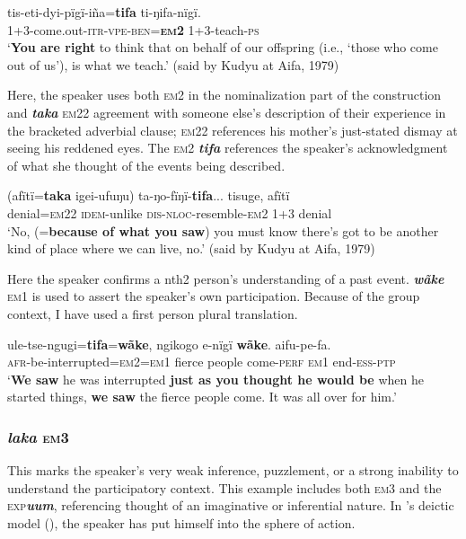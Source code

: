 \documentclass[output=paper]{langsci/langscibook}
\begin{document}
\begin{exe}
	\ex \label{ex:eb2}
	\gll tis-eti-dyi-pïgï-iña=\textbf{tifa} ti-ŋifa-nïgï.\\
	1+3-come.out-\textsc{itr}-\textsc{vpe}-\textsc{ben}=\textbf{\textsc{em}2} 1+3-teach-\textsc{ps}\\
	\trans ‘\textbf{You are right} to think that on behalf of our offspring (i.e., ‘those who come out of us’), is what we teach.' (said by Kudyu at Aifa, 1979)
\end{exe}

Here, the speaker uses both \textsc{em}2 in the nominalization part of the construction and  \textbf{\textit{taka}} \textsc{em}22 agreement with someone else’s description of their experience in the bracketed adverbial clause;  \textsc{em}22 references his mother’s just-stated dismay at seeing his reddened eyes. The \textsc{em}2 \textbf{\textit{tifa}} references the speaker’s acknowledgment of what she thought of the events being described. 

\begin{exe}
	\ex \label{ex:eb3}
	\gll (afïtï=\textbf{taka} igei-ufuŋu) ta-ŋo-fïŋï-\textbf{tifa}... tisuge, afïtï\\
	denial=\textsc{em}22 \textsc{idem}-unlike \textsc{dis-nloc}-resemble-\textsc{em}2 1+3 denial\\
	\trans ‘No, (=\textbf{because of what you saw}) you must know there’s got to be another kind of place where we can live, no.' (said by Kudyu at Aifa, 1979)
\end{exe}

Here the speaker confirms a nth{2} person’s understanding of a past event.  \textbf{\textit{wãke}} \textsc{em}1 is used to assert the speaker’s own participation. Because of the group context,  I have used a first person plural translation. 

\begin{exe}
	\ex \label{ex:eb4}
	\gll ule-tse-ngugi=\textbf{tifa}=\textbf{wãke}, ngikogo e-nïgï \textbf{wãke}. aifu-pe-fa.\\
	\textsc{afr}-be-interrupted=\textsc{em2=em1} {fierce people} come-\textsc{perf} \textsc{em1} end-\textsc{ess-ptp}\\
	\trans ‘\textbf{We saw} he was interrupted \textbf{just as you thought he would be} when he started things, \textbf{we saw} the fierce people come. It was all over for him.’
\end{exe}

\subsubsection{\textit{laka} \textsc{em}3} 
This marks the speaker’s  very weak inference, puzzlement, or a strong inability to understand the participatory context. 
This example includes both \textsc{em}3 and the \textsc{exp}\textbf{\textit{uum}}, referencing thought of an imaginative or inferential nature. In \citeauthor{Haan2001}’s deictic model (\citeyear{Haan2001}), the speaker has put himself into the sphere of action.
\end{document}
